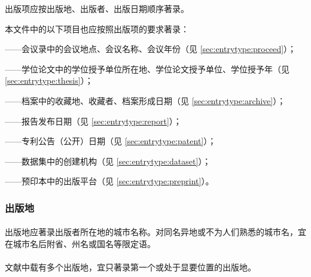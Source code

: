 \documentclass[twoside]{article}%
\begin{document}
出版项应按出版地、出版者、出版日期顺序著录。

本文件中的以下项目也应按照出版项的要求著录：

——会议录中的会议地点、会议名称、会议年份（见 \ref{sec:entrytype:proceed}）；

——学位论文中的学位授予单位所在地、学位论文授予单位、学位授予年（见 \ref{sec:entrytype:thesis}）；

——档案中的收藏地、收藏者、档案形成日期（见 \ref{sec:entrytype:archive}）；

——报告发布日期（见 \ref{sec:entrytype:report}）；

——专利公告（公开）日期（见 \ref{sec:entrytype:patent}）；

——数据集中的创建机构（见 \ref{sec:entrytype:dataset}）；

——预印本中的出版平台（见 \ref{sec:entrytype:preprint}）。

\begin{refsection}
\nocite{egbookpuba--}
\nocite{egbookpubb--}
\nocite{egbookpubc--}
\nocite{egbookpubd--}
\nocite{egbookpube--}
{}
\end{refsection}

\subsubsection{出版地}

\paragraph{}\label{sec:addr:city} 出版地应著录出版者所在地的城市名称。对同名异地或不为人们熟悉的城市名，宜在城市名后附省、州名或国名等限定语。

\begin{refsection}
\togglefalse{bbx:gbpub}
\nocite{egbookpubaddressa--}
\nocite{egbookpubaddressb--}


{}
\end{refsection}


\paragraph{} 文献中载有多个出版地，宜只著录第一个或处于显要位置的出版地。
\end{document}
